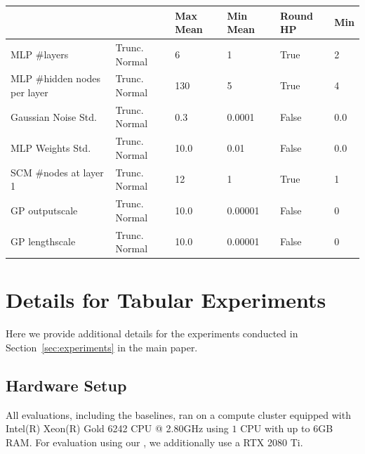 \documentclass{article}
\begin{document}
\begin{table}[htbp]
\begin{tabular}{llllll}
    \toprule
    {} &  & Max Mean & Min Mean & Round HP & Min \\
    \midrule
    MLP \#layers                 &      Trunc. Normal &        6 &        1 &        True &           2 \\
    MLP \#hidden nodes per layer &      Trunc. Normal &      130 &        5 &        True &           4 \\
    Gaussian Noise Std.          &      Trunc. Normal &      0.3 &   0.0001 &       False &         0.0 \\
    MLP Weights Std.             &      Trunc. Normal &     10.0 &     0.01 &       False &         0.0 \\
    SCM \#nodes at layer 1        &      Trunc. Normal &       12 &        1 &        True &           1 \\
    GP outputscale               &      Trunc. Normal &     10.0 &  0.00001 &       False &           0 \\
    GP lengthscale               &      Trunc. Normal &     10.0 &  0.00001 &       False &           0 \\
    \bottomrule
    \end{tabular}
    \label{tab:diffable_hps}
\end{table}


\section{Details for Tabular Experiments}\label{app:expdetails}

Here we provide additional details for the experiments conducted in Section~\ref{sec:experiments} in the main paper. 

\subsection{Hardware Setup} \label{app:ssec:hardware}
All evaluations, including the baselines, ran on a compute cluster equipped with Intel(R) Xeon(R) Gold 6242 CPU @ 2.80GHz using $1$ CPU with up to $6$GB RAM. For evaluation using our \methodname{}, we additionally use a RTX 2080 Ti.
\end{document}
